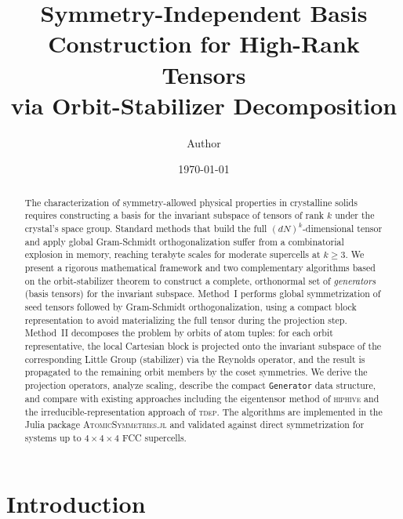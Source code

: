 \documentclass[twocolumn,amsmath,amssymb,aps,prb,10pt,floatfix]{revtex4-2}
\begin{document}
\title{Symmetry-Independent Basis Construction for High-Rank Tensors\\via Orbit-Stabilizer Decomposition}

\author{Author}

\date{\today}

\begin{abstract}
The characterization of symmetry-allowed physical properties in crystalline solids requires constructing a basis for the invariant subspace of tensors of rank $k$ under the crystal's space group.
Standard methods that build the full $(dN)^k$-dimensional tensor and apply global Gram-Schmidt orthogonalization suffer from a combinatorial explosion in memory, reaching terabyte scales for moderate supercells at $k \geq 3$.
We present a rigorous mathematical framework and two complementary algorithms based on the orbit-stabilizer theorem to construct a complete, orthonormal set of \emph{generators} (basis tensors) for the invariant subspace.
Method~I performs global symmetrization of seed tensors followed by Gram-Schmidt orthogonalization, using a compact block representation to avoid materializing the full tensor during the projection step.
Method~II decomposes the problem by orbits of atom tuples: for each orbit representative, the local Cartesian block is projected onto the invariant subspace of the corresponding Little Group (stabilizer) via the Reynolds operator, and the result is propagated to the remaining orbit members by the coset symmetries.
We derive the projection operators, analyze scaling, describe the compact \texttt{Generator} data structure, and compare with existing approaches including the eigentensor method of \textsc{hiphive} and the irreducible-representation approach of \textsc{tdep}.
The algorithms are implemented in the Julia package \textsc{AtomicSymmetries.jl} and validated against direct symmetrization for systems up to $4\times4\times4$ FCC supercells.
\end{abstract}

\maketitle

\section{Introduction}
\label{sec:intro}
\end{document}
